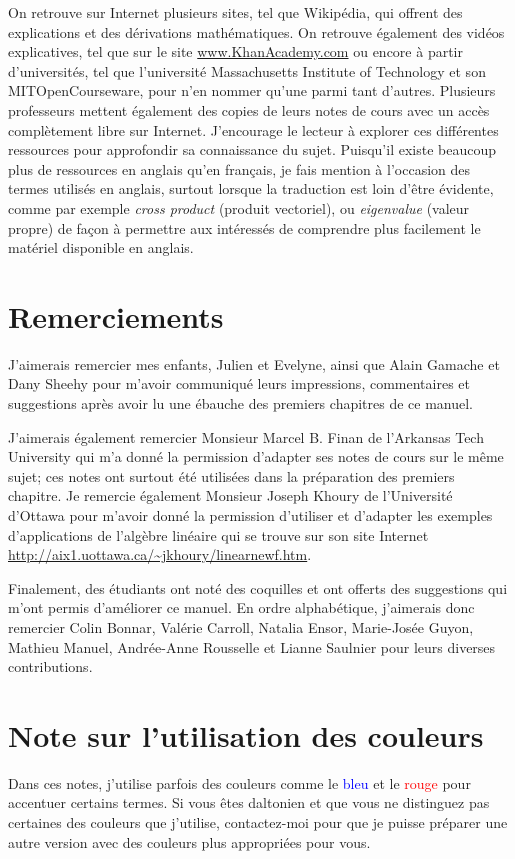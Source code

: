 On retrouve sur Internet plusieurs sites, tel que Wikipédia, qui offrent des explications et des dérivations mathématiques.  
On retrouve également des vidéos explicatives, tel que sur le site \url{www.KhanAcademy.com} ou encore à partir d'universités,
tel que l'université Massachusetts Institute of Technology et son MITOpenCourseware, pour n'en nommer qu'une parmi tant d'autres.
Plusieurs professeurs mettent également des copies de leurs notes de cours avec un accès complètement libre sur Internet.
J'encourage le lecteur à explorer ces différentes ressources pour approfondir sa connaissance du sujet.
Puisqu'il existe beaucoup plus de ressources en anglais qu'en français, je fais mention à l'occasion des termes utilisés en
anglais, surtout lorsque la traduction est loin d'être évidente, comme par exemple \textit{cross product} (produit vectoriel),
ou \textit{eigenvalue} (valeur propre) de façon à permettre aux intéressés de comprendre plus facilement le 
matériel disponible en anglais.

\section{Remerciements}

J'aimerais remercier mes enfants, Julien et Evelyne, ainsi que Alain Gamache et Dany Sheehy pour m'avoir communiqué leurs impressions, commentaires et suggestions après avoir lu une ébauche des premiers chapitres de ce manuel.  

J'aimerais également remercier Monsieur Marcel B. Finan de l'Arkansas Tech University qui m'a donné la
permission d'adapter ses notes de cours sur le même sujet; ces notes ont surtout été utilisées dans la préparation
des premiers chapitre.  Je remercie également Monsieur Joseph Khoury de l'Université d'Ottawa pour m'avoir
donné la permission d'utiliser et d'adapter les exemples d'applications de l'algèbre linéaire qui 
se trouve sur son site Internet \url{http://aix1.uottawa.ca/~jkhoury/linearnewf.htm}.

Finalement, des étudiants ont noté des coquilles et ont offerts des suggestions qui m'ont permis d'améliorer
ce manuel.  En ordre alphabétique, j'aimerais donc remercier Colin Bonnar, Valérie Carroll, Natalia Ensor, Marie-Josée Guyon,
Mathieu Manuel, Andrée-Anne Rousselle et Lianne Saulnier  pour leurs diverses contributions.

\section{Note sur l'utilisation des couleurs}

Dans ces notes, j'utilise parfois des couleurs comme  le \textcolor{blue}{bleu} et le \textcolor{red}{rouge} pour accentuer certains termes.  Si vous êtes daltonien et que vous ne distinguez pas certaines des couleurs que j'utilise, contactez-moi pour que je puisse préparer une autre version avec des couleurs plus appropriées pour vous.

